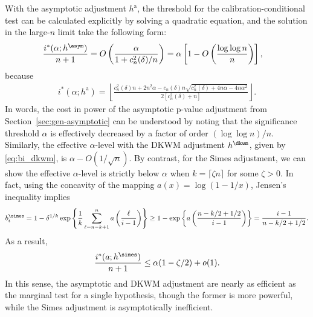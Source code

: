 With the asymptotic adjustment $h^{\mathrm{a}}$, the threshold for the calibration-conditional test can be calculated explicitly by solving a quadratic equation, and the solution in the large-$n$ limit take the following form:
\begin{align*}
  \frac{i^*(\alpha; h^\asym)}{n+1}
  & = O\left(\frac{\alpha}{1+ c^2_n(\delta)/n}\right) = \alpha \left[ 1 - O \left(\frac{\log \log n}{n} \right) \right],
\end{align*}
because
\begin{align*}
  i^*(\alpha; h^{\mathrm{a}})
    =
    \left\lfloor\frac{c^2_n(\delta) n + 2 n^2 \alpha - c_n(\delta) n \sqrt{c^2_n(\delta) + 4n \alpha - 4n \alpha^2}}{2 [c^2_n(\delta) + n]}\right\rfloor.
\end{align*}
In words, the cost in power of the asymptotic p-value adjustment from Section~\ref{sec:gen-asymptotic} can be understood by noting that the significance threshold $\alpha$ is effectively decreased by a factor of order $(\log \log n)/n$. Similarly, the effective $\alpha$-level with the DKWM adjustment $h^\dkwm$, given by \eqref{eq:bi_dkwm}, is $\alpha - O(1/\sqrt{n})$. By contrast, for the Simes adjustment, we can show the effective $\alpha$-level is strictly below $\alpha$ when $k = \lceil\zeta n\rceil$ for some $\zeta > 0$.
In fact, using the concavity of the mapping $a(x) = \log(1 - 1/x)$, Jensen's inequality implies
\begin{equation}\label{eq:bi_simes}
b_{i}^{\simes} = 1 - \delta^{1/k}\exp\left\{\frac{1}{k}\sum_{\ell = n-k+1}^{n}a\left(\frac{\ell}{i - 1}\right)\right\}\ge 1 - \exp\left\{a\left(\frac{n - k / 2 + 1/2}{i - 1}\right)\right\} = \frac{i - 1}{n - k /2 + 1/2}.
\end{equation}
As a result,
\begin{equation}\label{eq:simes_alpha}
\frac{i^{*}(a; h^{\simes})}{n+1} \le  \alpha(1 - \zeta / 2) + o(1).
\end{equation}
In this sense, the asymptotic and DKWM adjustment are nearly as efficient as the marginal test for a single hypothesis, though the former is more powerful, while the Simes adjustment is asymptotically inefficient.

